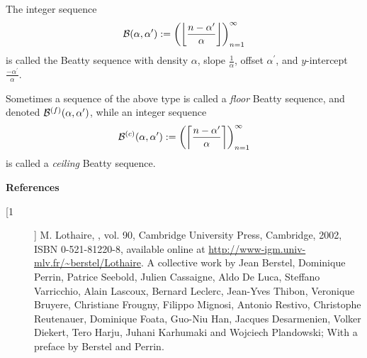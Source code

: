 \documentclass[12pt]{article}
\newcommand{\floor}[1]{\left\lfloor #1 \right\rfloor}
\newcommand{\ceiling}[1]{\left\lceil #1 \right\rceil}
\begin{document}

The integer sequence
    $$ {\cal B}(\alpha,\alpha^\prime) := \left( \floor{\frac{n-\alpha^\prime}{\alpha}} \right)_{n=1}^\infty $$
is called the Beatty sequence with density $\alpha$, slope $\frac{1}{\alpha}$, offset $\alpha^\prime$, and
$y$-intercept $\frac{-\alpha^\prime}{\alpha}$.

Sometimes a sequence of the above type is called a {\em floor} Beatty sequence, and denoted ${\cal
B}^{(f)}(\alpha,\alpha^\prime)$, while an integer sequence
    $$ {\cal B}^{(c)}(\alpha,\alpha^\prime) :=
        \left( \ceiling{\frac{n-\alpha^\prime}{\alpha}} \right)_{n=1}^\infty $$
is called a {\em ceiling} Beatty sequence.

{\bf References}
\begin{description}
\item[ [1] ] M. Lothaire, , vol. 90, Cambridge University Press, Cambridge, 2002, ISBN 0-521-81220-8, available online at \url{http://www-igm.univ-mlv.fr/~berstel/Lothaire}. A collective work by Jean Berstel, Dominique Perrin, Patrice Seebold, Julien Cassaigne, Aldo De Luca, Steffano Varricchio,
            Alain Lascoux, Bernard Leclerc, Jean-Yves Thibon, Veronique
            Bruyere, Christiane Frougny, Filippo Mignosi, Antonio Restivo,
            Christophe Reutenauer, Dominique Foata, Guo-Niu Han, Jacques
            Desarmenien, Volker Diekert, Tero Harju, Juhani Karhumaki and
            Wojciech Plandowski;
            With a preface by Berstel and Perrin. 
\end{description}

%
\end{document}
